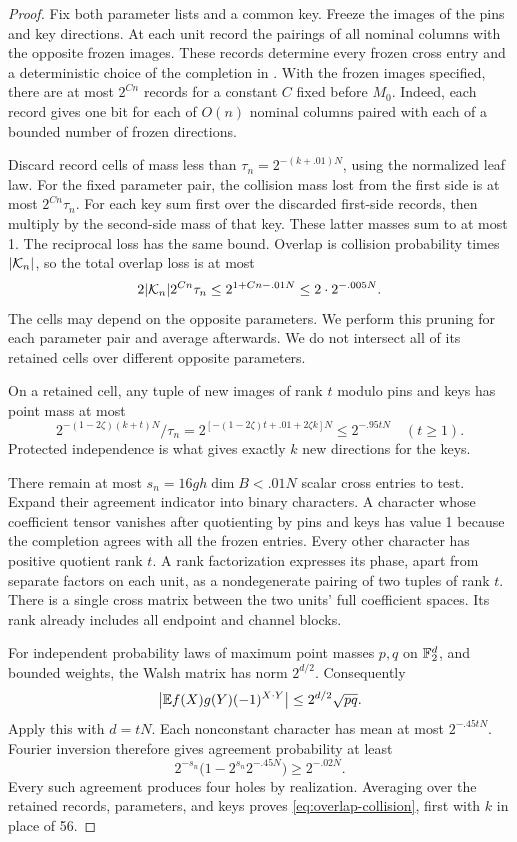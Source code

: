 \begin{proof}
Fix both parameter lists and a common key. Freeze the images of the pins
and key directions. At each unit record the pairings of all nominal columns
with the opposite frozen images. These records determine every frozen
cross entry and a deterministic choice of the completion in
. With the frozen images specified, there are at most \(2^{Cn}\) records
for a constant \(C\) fixed before \(M_0\). Indeed, each record gives one
bit for each of \(O(n)\) nominal columns paired with each of a bounded
number of frozen directions.

Discard record cells of mass less than
\(\tau_n=2^{-(k+.01)N}\), using the normalized leaf law.
For the fixed parameter pair, the collision mass lost from the first
side is at most \(2^{Cn}\tau_n\). For each key sum first over the
discarded first-side records, then multiply by the second-side mass of
that key. These latter masses sum to at most 1.
The reciprocal loss has the same bound. Overlap is collision probability
times \(|\mathcal K_n|\), so the total overlap loss is at most
\[
 2|\mathcal K_n|2^{Cn}\tau_n\le2^{1+Cn-.01N}\le2\cdot2^{-.005N}.
\]
The cells may depend on the opposite parameters. We perform this pruning
for each parameter pair and average afterwards. We do not intersect all
of its retained cells over different opposite parameters.

On a retained cell, any tuple of new images of rank \(t\) modulo pins
and keys has point mass at most
\[
 2^{-(1-2\zeta)(k+t)N}/\tau_n
 =2^{[-(1-2\zeta)t+.01+2\zeta k]N}
 \le2^{-.95tN}\quad(t\ge1).
\]
Protected independence is what gives exactly \(k\) new directions for
the keys.

There remain at most \(s_n=16gh\dim B<.01N\) scalar cross entries to
test. Expand their agreement indicator into binary characters. A character
whose coefficient tensor vanishes after quotienting by pins and keys has value 1 because the completion agrees with all the frozen
entries. Every other character has positive quotient rank \(t\).
A rank factorization expresses its phase, apart from separate factors
on each unit, as a nondegenerate pairing of two tuples of rank \(t\).
There is a single cross matrix between the two units' full coefficient
spaces. Its rank already includes all endpoint and channel blocks.

For independent probability laws of maximum point masses \(p,q\) on
\(\mathbb F_2^d\), and bounded weights, the Walsh matrix has norm \(2^{d/2}\).
Consequently
\begin{equation}\label{eq:walsh-bound}
 \left|\mathbb E f(X)g(Y)(-1)^{X\cdot Y}\right|
 \le2^{d/2}\sqrt{pq}.
\end{equation}
Apply this with \(d=tN\). Each nonconstant character has mean at most
\(2^{-.45tN}\). Fourier inversion therefore gives agreement probability
at least
\[
 2^{-s_n}\bigl(1-2^{s_n}2^{-.45N}\bigr)\ge2^{-.02N}.
\]
Every such agreement produces four holes by realization. Averaging over
the retained records, parameters, and keys proves
\eqref{eq:overlap-collision}, first with \(k\) in place of 56.


\end{proof}
